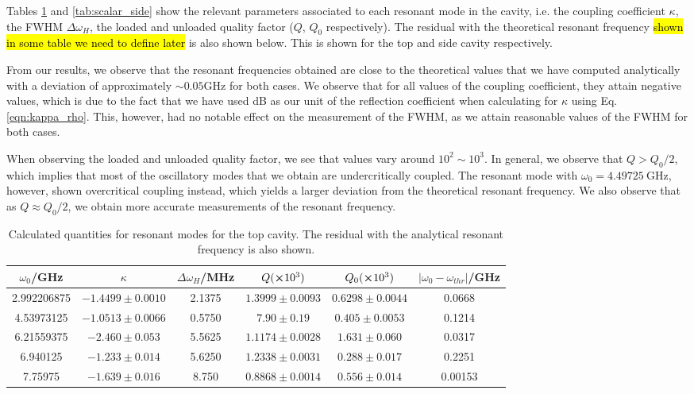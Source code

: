 \documentclass[a4paper]{report}
\numberwithin{equation}{section}
\begin{document}
Tables \ref{tab:scalar_top} and \ref{tab:scalar_side} show the relevant parameters associated to each resonant mode in the cavity, i.e. the coupling coefficient $\kappa$, 
the FWHM $\Delta\omega_H$, the loaded and unloaded quality factor ($Q$, $Q_0$ respectively). The residual with the theoretical resonant frequency \hl{shown in some table we need to define later}
 is also shown below. This is shown for the top and side cavity respectively. \par 

From our results, we observe that the resonant frequencies obtained are close to the theoretical values that we have computed analytically with a deviation of approximately 
$\sim 0.05 \si{\giga\hertz}$ for both cases. We observe that for all values of the coupling coefficient, they attain negative values, which is due to the fact that we have used 
dB as our unit of the reflection coefficient when calculating for $\kappa$ using Eq. \ref{eqn:kappa_rho}. This, however, had no notable effect on the measurement of the FWHM, as 
we attain reasonable values of the FWHM for both cases. \par 

When observing the loaded and unloaded quality factor, we see that values vary around $10^2 \sim 10^3$. In general, we observe that $Q > Q_0 / 2$, which implies
that most of the oscillatory modes that we obtain are undercritically coupled. The resonant mode with $\omega_0 = \SI{4.49725}{\giga\hertz}$, however, shown overcritical 
coupling instead, which yields a larger deviation from the theoretical resonant frequency. We also observe that as $Q \approx Q_0 / 2$, we obtain more accurate measurements
of the resonant frequency. \par  



\begin{table}[h!]
	\centering
	\begin{tabular}{|c|c|c|c|c|c|}
		\hline $\omega_0$/GHz & $\kappa$ & $\Delta\omega_H$/MHz & $Q (\cross 10^3) $ & $Q_0 (\cross 10^3)$ & $\left| \omega_0 - \omega_{thr} \right|$/GHz \\ 
		\hline 2.992206875 & $-1.4499 \pm 0.0010$  & 2.1375 & $1.3999 \pm 0.0093$ & $0.6298 \pm 0.0044$ & 0.0668\\ 
		\hline 4.53973125 &  $-1.0513 \pm 0.0066$ &  0.5750 & $7.90 \pm 0.19$ & $0.405 \pm 0.0053$ & 0.1214\\
		\hline 6.21559375 &  $ -2.460 \pm 0.053$  & 5.5625 & $1.1174 \pm 0.0028$ & $1.631 \pm 0.060$ & 0.0317\\
		\hline 6.940125 &  $-1.233 \pm 0.014$  & 5.6250 & $1.2338 \pm 0.0031$ & $0.288 \pm 0.017$ & 0.2251\\ 
		\hline 7.75975 &  $-1.639 \pm 0.016$  & 8.750 & $0.8868 \pm 0.0014$ & $0.556 \pm 0.014$ & 0.00153\\ 
		\hline
	\end{tabular}
	\caption{Calculated quantities for resonant modes for the top cavity. The residual with the analytical resonant frequency is also shown.}
	\label{tab:scalar_top}
\end{table}
\end{document}
